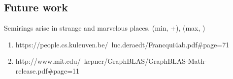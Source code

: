 \documentclass[11pt]{article}
\begin{document}
    \subsection{Future work}

    Semirings arise in strange and marvelous places. (min, +), (max, \times)

    \begin{enumerate}
    \item https://people.cs.kuleuven.be/~luc.deraedt/Francqui4ab.pdf#page=71
    \item http://www.mit.edu/~kepner/GraphBLAS/GraphBLAS-Math-release.pdf#page=11
    \end{enumerate}

    
    
\end{document}

